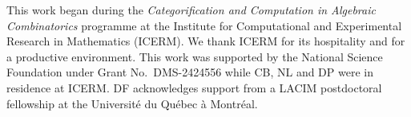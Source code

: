\documentclass[11pt,a4paper,reqno]{amsart}
\numberwithin{equation}{section}
\theoremstyle{definition}
\theoremstyle{remark}
\theoremstyle{plain}
\begin{document}
\smallskip
{}
This work began during the \emph{Categorification and Computation in Algebraic Combinatorics} programme
at the Institute for Computational and Experimental Research in Mathematics (ICERM). We thank ICERM for its hospitality and for a productive environment. This  work was supported by the National Science Foundation under Grant No.\ DMS-2424556 while CB, NL and DP were in residence at ICERM.
DF acknowledges support from a LACIM postdoctoral fellowship at the Université du Québec à Montréal.
\end{document}
